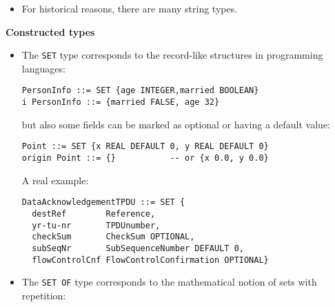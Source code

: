 \documentclass[12pt]{article}
\begin{document}
\begin{slide}
\begin{itemize}
  \item For historical reasons, there are many string types.

\end{itemize}

\bigskip

\noindent
\textbf{Constructed types}

\begin{itemize}

  \item The \texttt{SET} type corresponds to the record-like
        structures in programming languages:

\begin{verbatim}
PersonInfo ::= SET {age INTEGER,married BOOLEAN}
i PersonInfo ::= {married FALSE, age 32}
\end{verbatim}

        but also some fields can be marked as optional or having a
        default value:

\begin{verbatim}
Point ::= SET {x REAL DEFAULT 0, y REAL DEFAULT 0}
origin Point ::= {}           -- or {x 0.0, y 0.0}
\end{verbatim}



        A real example:

\begin{verbatim}
DataAcknowledgementTPDU ::= SET {
  destRef        Reference,
  yr-tu-nr       TPDUnumber,
  checkSum       CheckSum OPTIONAL,
  subSeqNr       SubSequenceNumber DEFAULT 0,
  flowControlCnf FlowControlConfirmation OPTIONAL}
\end{verbatim}




  \item The \texttt{SET OF} type corresponds to the mathematical
        notion of sets with repetition:


\end{itemize}
\end{slide}
\end{document}
